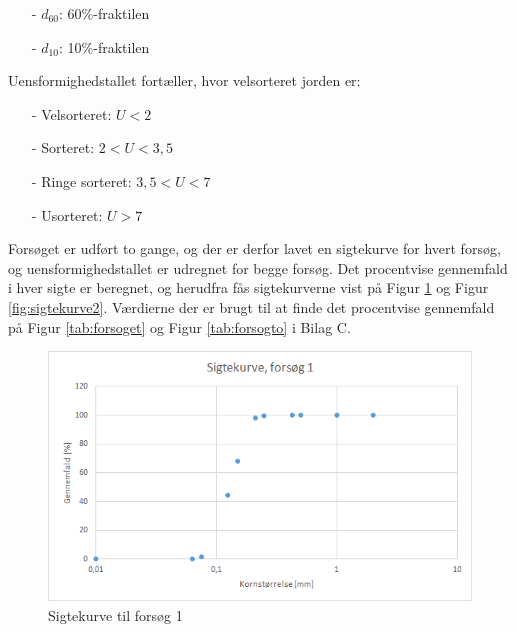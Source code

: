 \begin{itemize}
	\item[-] $d_{60}$: 60\%-fraktilen
	\item[-] $d_{10}$: 10\%-fraktilen
\end{itemize}

Uensformighedstallet fortæller, hvor velsorteret jorden er:
\begin{itemize}
	\item[-] Velsorteret: $U < 2$
	\item[-] Sorteret: $2 < U < 3,\!5$
	\item[-] Ringe sorteret: $3,\!5 < U < 7$
	\item[-] Usorteret: $U > 7$
\end{itemize}

Forsøget er udført to gange, og der er derfor lavet en sigtekurve for hvert forsøg, og uensformighedstallet er udregnet for begge forsøg. 
\newline \indent{     }  Det procentvise gennemfald i hver sigte er beregnet, og herudfra fås sigtekurverne vist på Figur \ref{fig:sigtekurve1} og Figur \ref{fig:sigtekurve2}. Værdierne der er brugt til at finde det procentvise gennemfald på Figur \ref{tab:forsoget} og Figur \ref{tab:forsogto} i Bilag C. 

\begin{figure}[htbp]
		\includegraphics[width=1.0\textwidth]{billeder/sigtekurve1.png}
		\caption{Sigtekurve til forsøg 1}
		\label{fig:sigtekurve1}
\end{figure}

